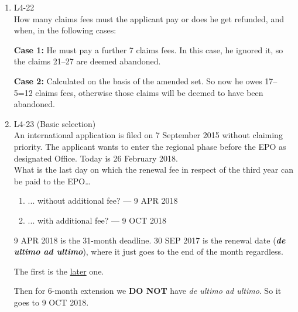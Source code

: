\documentclass{report}
\begin{document}
\begin{enumerate}[label=\textbf{Answer \arabic*}]
\begin{enumerate}[label=\textbf{Answer \arabic*}]
    \item %
    L4-22 \\
    How many claims fees must the applicant pay or does he get refunded, and when, in the following cases:
    
    \vspace{1em}
    \textbf{Case 1:} He must pay a further 7 claims fees. In this case, he ignored it, so the claims 21--27 are deemed abandoned. 
    
    \vspace{1em}
    \textbf{Case 2:} Calculated on the basis of the amended set. So now he owes 17--5=12 claims fees, otherwise those claims will be deemed to have been abandoned. 

    \item %
    L4-23 (Basic selection) \\
    An international application is filed on 7 September 2015 without claiming priority. The applicant wants to enter the regional phase before the EPO as designated Office. Today is 26 February 2018. \\
    What is the last day on which the renewal fee in respect of the third year can be paid to the EPO…
    \begin{enumerate}[label=(\alph*)]
        \item ... without additional fee? --- { \textsc{9 APR 2018}}
        \item ... with additional fee? --- { \textsc{9 OCT 2018}}
    \end{enumerate}

    \textsc{9 APR 2018} is the 31-month deadline. 
    \textsc{30 SEP 2017} is the renewal date (\textit{\textbf{de ultimo ad ultimo}}), where it just goes to the end of the month regardless.
    
    The first is the \underline{later} one. 
    
    Then for 6-month extension we \textbf{DO NOT} have \textit{de ultimo ad ultimo}. So it goes to \textsc{9 OCT 2018}.
    
    

\end{enumerate}
\end{enumerate}
\end{document}
